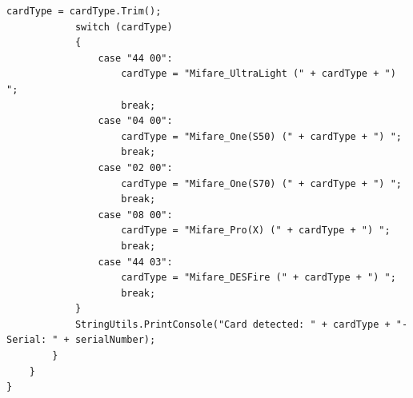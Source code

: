 \begin{lstlisting}[language=CSharp, caption={SPIExample.cs - RFID Reading interval}]
            cardType = cardType.Trim();
            switch (cardType)
            {
                case "44 00":
                    cardType = "Mifare_UltraLight (" + cardType + ") ";
                    break;
                case "04 00":
                    cardType = "Mifare_One(S50) (" + cardType + ") ";
                    break;
                case "02 00":
                    cardType = "Mifare_One(S70) (" + cardType + ") ";
                    break;
                case "08 00":
                    cardType = "Mifare_Pro(X) (" + cardType + ") ";
                    break;
                case "44 03":
                    cardType = "Mifare_DESFire (" + cardType + ") ";
                    break;
            }
            StringUtils.PrintConsole("Card detected: " + cardType + "- Serial: " + serialNumber);
        }
    }
}
\end{lstlisting}

